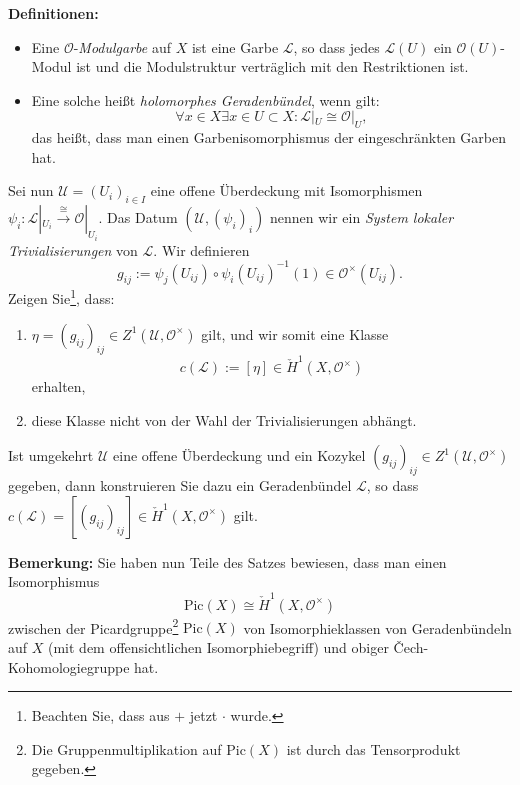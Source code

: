 \documentclass[a4paper,11pt]{article}
\newcounter{aufg}
\newcommand{\Aufg}{\stepcounter{aufg}\vspace*{0.2cm}\noindent{\bf
    Aufgabe \arabic{aufg}:} }
\begin{document}
\vspace{0.5em}
\textbf{Definitionen:}
\begin{itemize}
	\item Eine \(\mathcal{O}\)-\emph{Modulgarbe} auf \(X\) ist eine Garbe \(\mathcal{L}\), so dass jedes \(\mathcal{L}(U)\) ein \(\mathcal{O}(U)\)-Modul ist und die Modulstruktur verträglich mit den Restriktionen ist.
	\item Eine solche heißt \emph{holomorphes Geradenbündel}, wenn gilt:
	\[
	\forall x\in X \exists x\in U\subset X : \mathcal{L}|_U \cong \mathcal{O}|_U,
	\]
	das heißt, dass man einen Garbenisomorphismus der eingeschränkten Garben hat.
\end{itemize}

Sei nun \(\mathscr{U}=(U_i)_{i\in I}\) eine offene Überdeckung mit Isomorphismen \(\psi_i:\mathcal{L}|_{U_i}\xrightarrow{\cong}\mathcal{O}|_{U_i}\). Das Datum \((\mathscr{U},(\psi_i)_i)\) nennen wir ein \emph{System lokaler Trivialisierungen} von \(\mathcal{L}\). Wir definieren
\[
g_{ij} := \psi_j(U_{ij})\circ\psi_i(U_{ij})^{-1}(1)\in \mathcal{O}^\times(U_{ij}).
\]
Zeigen Sie\footnote{Beachten Sie, dass aus \(+\) jetzt \(\cdot\) wurde.}, dass:

\begin{enumerate}[label=\roman*)]
	\item \(\eta=(g_{ij})_{ij}\in Z^1(\mathscr{U},\mathcal{O}^\times)\) gilt, und wir somit eine Klasse
	\[
	c(\mathcal{L}):=[\eta]\in \check{H}^1(X,\mathcal{O}^\times)
	\]
	erhalten,
	\item diese Klasse nicht von der Wahl der Trivialisierungen abhängt.
\end{enumerate}


\vspace{1em}

\Aufg Ist umgekehrt \(\mathscr{U}\) eine offene Überdeckung und ein Kozykel \((g_{ij})_{ij}\in Z^1(\mathscr{U},\mathcal{O}^\times)\) gegeben, dann konstruieren Sie dazu ein Geradenbündel \(\mathcal{L}\), so dass \(c(\mathcal{L})=[(g_{ij})_{ij}]\in\check{H}^1(X,\mathcal{O}^\times)\) gilt.

\vspace{1em}

\textbf{Bemerkung:} Sie haben nun Teile des Satzes bewiesen, dass man einen Isomorphismus
\[
\mathrm{Pic}(X)\cong \check{H}^1(X,\mathcal{O}^\times)
\]
zwischen der Picardgruppe\footnote{Die Gruppenmultiplikation auf \(\mathrm{Pic}(X)\) ist durch das Tensorprodukt gegeben.} \(\mathrm{Pic}(X)\) von Isomorphieklassen von Geradenbündeln auf \(X\) (mit dem offensichtlichen Isomorphiebegriff) und obiger Čech-Kohomologiegruppe hat.
\end{document}
